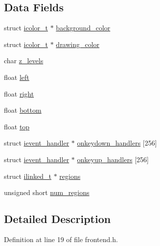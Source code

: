 \subsection*{Data Fields}
\begin{DoxyCompactItemize}
\item 
struct \hyperlink{structicolor__t}{icolor\-\_\-t} $\ast$ \hyperlink{structifrontendstate__t_afb7c49000e593f77bcb30b1ae4384ded}{background\-\_\-color}
\item 
struct \hyperlink{structicolor__t}{icolor\-\_\-t} $\ast$ \hyperlink{structifrontendstate__t_ac81d750ec8cd1ba1d44e2c0f55bea687}{drawing\-\_\-color}
\item 
char \hyperlink{structifrontendstate__t_aefb96a4cd8758bcd9a3e5b506290adca}{z\-\_\-levels}
\item 
float \hyperlink{structifrontendstate__t_a54ee910059c66c18fa1bb1555d0e61c5}{left}
\item 
float \hyperlink{structifrontendstate__t_a7c304035e472522fb01b3bb85b37eef8}{right}
\item 
float \hyperlink{structifrontendstate__t_adc025993349dceae53dfe235f84fdef2}{bottom}
\item 
float \hyperlink{structifrontendstate__t_afda9cb91a47174c6e95a4888918964f4}{top}
\item 
struct \hyperlink{structievent__handler}{ievent\-\_\-handler} $\ast$ \hyperlink{structifrontendstate__t_ad8fd468eaec37b949af562b39ad20d5a}{onkeydown\-\_\-handlers} \mbox{[}256\mbox{]}
\item 
struct \hyperlink{structievent__handler}{ievent\-\_\-handler} $\ast$ \hyperlink{structifrontendstate__t_a5bb9423c4ba5f86cd8a0d50575031952}{onkeyup\-\_\-handlers} \mbox{[}256\mbox{]}
\item 
struct \hyperlink{structilinked__t}{ilinked\-\_\-t} $\ast$ \hyperlink{structifrontendstate__t_a42ce77321ecea4fde68dd68b7f0f2283}{regions}
\item 
unsigned short \hyperlink{structifrontendstate__t_ad30593dd0b69372008108075c55cfe27}{num\-\_\-regions}
\end{DoxyCompactItemize}


\subsection{Detailed Description}


Definition at line 19 of file frontend.\-h.



